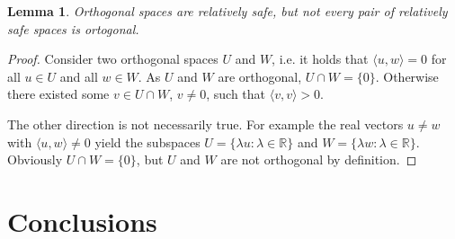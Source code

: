 \documentclass[]{article}
\newtheorem{lemma}{Lemma}
\begin{document}
\begin{lemma}
	Orthogonal spaces are relatively safe, but not every pair of relatively safe spaces is ortogonal.
\end{lemma}

\begin{proof}
	Consider two orthogonal spaces $U$ and $W$, i.e. it holds that $\langle u, w \rangle = 0$ for all $u \in U$ and all $w \in W$. As $U$ and $W$ are orthogonal, $U \cap W = \{0\}$. Otherwise there existed some $v \in U \cap W$, $v \neq 0$, such that $\langle v, v \rangle > 0$.
	
	The other direction is not necessarily true. For example the real vectors $u \neq w$ with $\langle u,w \rangle \neq 0$ yield the subspaces $U = \{ \lambda u : \lambda \in \mathbb{R} \}$ and $W = \{ \lambda w : \lambda \in \mathbb{R}\}$. Obviously $U \cap W = \{0\}$, but $U$ and $W$ are not orthogonal by definition.
\end{proof}



\section{Conclusions}
\end{document}

